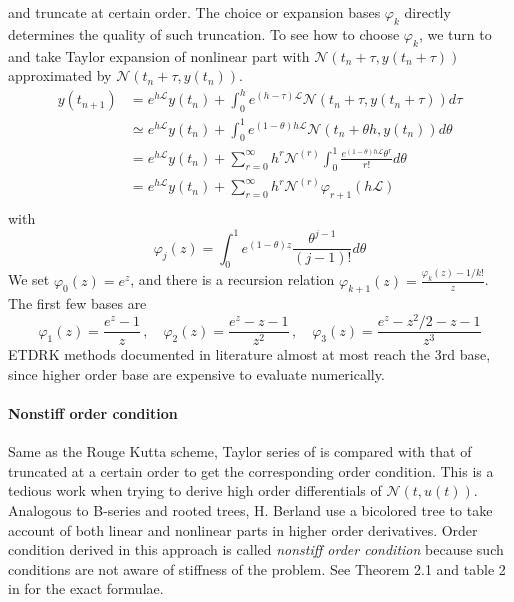 and truncate at certain order. The choice or expansion
bases $\varphi_k$ directly determines the quality of such truncation.
To see how to choose $\varphi_k$, we turn to  and
take Taylor expansion of nonlinear part with
$\mathcal{N}(t_n+\tau, y(t_n+\tau))$ approximated by $\mathcal{N}(t_n+\tau, y(t_n))$.
\begin{align*}
  \label{eq:nlTaylor}
  y(t_{n+1}) & = e^{h\mathcal{L}}y(t_n) + \int_0^h e^{(h-\tau)\mathcal{L}}
               \mathcal{N}(t_n+\tau, y(t_n+\tau)) d\tau \\
             & \simeq e^{h\mathcal{L}}y(t_n) + \int_0^1 e^{(1-\theta)h\mathcal{L}}
               \mathcal{N}(t_n+ \theta h, y(t_n)) d\theta \\
             & = e^{h\mathcal{L}}y(t_n) + \sum_{r=0}^{\infty} h^r \mathcal{N}^{(r)}
               \int_0^1 \frac{e^{(1-\theta)h\mathcal{L}}\theta^r}{r!} d\theta \\
             & = e^{h\mathcal{L}}y(t_n) + \sum_{r=0}^{\infty} h^r \mathcal{N}^{(r)}
               \varphi_{r+1}(h\mathcal{L})\\
\end{align*}
with
\begin{equation}
  \label{eq:nlphi}
  \varphi_j(z) =  \int_0^1 e^{(1-\theta)z}\frac{\theta^{j-1}}{(j-1)!} d\theta
\end{equation}
We set $\varphi_0(z)=e^{z}$, and there is a recursion relation
$\varphi_{k+1}(z) = \frac{\varphi_{k}(z)-1/k!}{z}$. The first few bases are
\[
  \varphi_1(z)= \frac{e^z-1}{z}\,,\quad
  \varphi_2(z)= \frac{e^z-z-1}{z^2}\,,\quad
  \varphi_3(z)= \frac{e^z-z^2/2-z-1}{z^3}
\]
ETDRK methods documented in literature almost at most reach the 3rd base, since
higher order base are expensive to evaluate numerically.

\paragraph{Nonstiff order condition} Same as the Rouge Kutta scheme, Taylor series
of  is compared with that of  truncated at
a certain order to get the corresponding order condition.
This is a tedious work when trying to derive high order differentials of
$\mathcal{N}(t, u(t))$.
Analogous to B-series and rooted trees,
H. Berland \etal{} use a bicolored tree to take account of both
linear and nonlinear parts in higher order derivatives.
Order condition derived in this approach
is called \emph{nonstiff order condition} because
such conditions are not aware of stiffness of the problem.
See Theorem 2.1 and table 2 in for the exact formulae.

